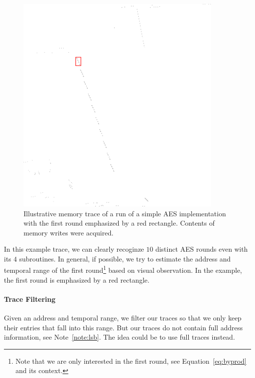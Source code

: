 		\begin{figure}[h!]
		\begin{center}
			\includegraphics[width=0.9\textwidth]{./figures/memtrace/memtrace_emph.png}
			\caption{Illustrative memory trace of a run of a simple AES implementation with the first round emphasized by a red rectangle. Contents of memory writes were acquired.}
			\label{fig:memtrace}
		\end{center}
		\end{figure}
		
		In this example trace, we can clearly recoginze $10$ distinct AES rounds even with its $4$ subroutines. In general, if possible, we try to estimate the address and temporal range of the first round\footnote{Note that we are only interested in the first round, see Equation~\ref{eq:byprod} and its context.} based on visual observation. In the example, the first round is emphasized by a red rectangle.

	\paragraph{Trace Filtering}
		
		Given an address and temporal range, we filter our traces so that we only keep their entries that fall into this range. But our traces do not contain full address information, see Note~\ref{note:lsb}. The idea could be to use full traces instead.
		
